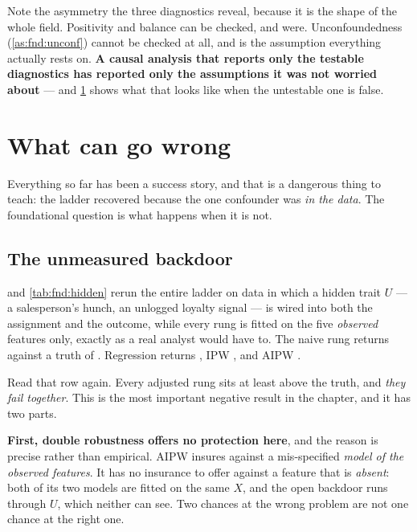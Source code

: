 

\begin{remark}
Note the asymmetry the three diagnostics reveal, because it is the shape of the whole field.
Positivity and balance can be checked, and were. Unconfoundedness (\cref{as:fnd:unconf}) cannot
be checked at all, and is the assumption everything actually rests on. \textbf{A causal analysis
that reports only the testable diagnostics has reported only the assumptions it was not worried
about} --- and \cref{sec:fnd:wrong} shows what that looks like when the untestable one is false.
\end{remark}

\section{What can go wrong}
\label{sec:fnd:wrong}

Everything so far has been a success story, and that is a dangerous thing to teach: the ladder
recovered \eur{\nbZeroTrueDag} because the one confounder was \emph{in the data}. The
foundational question is what happens when it is not.

\subsection*{The unmeasured backdoor}

 and \cref{tab:fnd:hidden} rerun the entire ladder on data in which a hidden
trait $U$ --- a salesperson's hunch, an unlogged loyalty signal --- is wired into both the
assignment and the outcome, while every rung is fitted on the five \emph{observed} features only,
exactly as a real analyst would have to. The naive rung returns \eur{\nbZeroHidNaive} against a
truth of \eur{\nbZeroHiddenTrue}. Regression returns \eur{\nbZeroHidReg}, IPW
\eur{\nbZeroHidIpw}, and AIPW \eur{\nbZeroHidAipw}.

Read that row again. Every adjusted rung sits at least \eur{\nbZeroHiddenMinBias} above the
truth, and \emph{they fail together}. This is the most important negative result in the chapter,
and it has two parts.

\textbf{First, double robustness offers no protection here}, and the reason is precise rather
than empirical. AIPW insures against a mis-specified \emph{model of the observed features}. It
has no insurance to offer against a feature that is \emph{absent}: both of its two models are
fitted on the same $X$, and the open backdoor runs through $U$, which neither can see. Two
chances at the wrong problem are not one chance at the right one.

